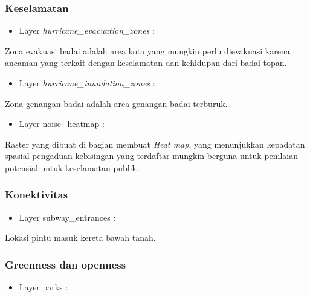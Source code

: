 \documentclass[]{book}
\providecommand{\tightlist}{%
  \setlength{\itemsep}{0pt}\setlength{\parskip}{0pt}}
\begin{document}
\hypertarget{keselamatan}{%
\subsubsection{Keselamatan}\label{keselamatan}}

\begin{itemize}
\tightlist
\item
  Layer \emph{hurricane\_evacuation\_zones} :
\end{itemize}

Zona evakuasi badai adalah area kota yang mungkin perlu dievakuasi karena ancaman yang terkait dengan keselamatan dan kehidupan dari badai topan.

\begin{itemize}
\tightlist
\item
  Layer \emph{hurricane\_inundation\_zones} :
\end{itemize}

Zona genangan badai adalah area genangan badai terburuk.

\begin{itemize}
\tightlist
\item
  Layer noise\_heatmap :
\end{itemize}

Raster yang dibuat di bagian membuat \emph{Heat map}, yang menunjukkan kepadatan spasial pengaduan kebisingan yang terdaftar mungkin berguna untuk penilaian potensial untuk keselamatan publik.

\hypertarget{konektivitas}{%
\subsubsection{Konektivitas}\label{konektivitas}}

\begin{itemize}
\tightlist
\item
  Layer subway\_entrances :
\end{itemize}

Lokasi pintu masuk kereta bawah tanah.

\hypertarget{greenness-dan-openness}{%
\subsubsection{Greenness dan openness}\label{greenness-dan-openness}}

\begin{itemize}
\tightlist
\item
  Layer parks :
\end{itemize}
\end{document}
